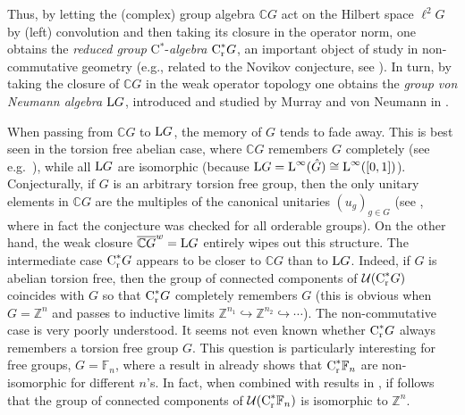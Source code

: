 \documentclass[a4paper,11pt]{amsart}
\numberwithin{equation}{section}
\begin{document}
Thus, by letting the (complex) group algebra ${\mathbb{C}} G$ act on the
Hilbert space $\ell^2 G$ by (left) convolution and then taking
its closure in the operator norm, one obtains the {\it reduced
group} C$^*$-{\it algebra} ${\text{\rm C}^*_{\text{\rm r}}} G$, an important object of
study in non-commutative geometry (e.g., related to the Novikov
conjecture, see \cite{Co94}). In turn, by taking the closure of ${\mathbb{C}}
G$ in the weak operator topology one obtains the {\it group von
Neumann algebra} ${\mathord{\text{\rm L}}} G$, introduced and studied by Murray and von
Neumann in \cite{MvN36, MvN43}.

When passing from ${\mathbb{C}} G$ to ${\mathord{\text{\rm L}}} G$, the memory of $G$ tends to fade
away. This is best seen in the torsion free abelian case, where ${\mathbb{C}}
G$ remembers $G$ completely (see e.g.\ \cite{Hi39}), while all ${\mathord{\text{\rm L}}}
G$ are isomorphic (because ${\mathord{\text{\rm L}}} G = {\mathord{\text{\rm L}}}^\infty(\hat{G}) \cong
{\mathord{\text{\rm L}}}^\infty([0,1])$). Conjecturally, if $G$ is an arbitrary torsion
free group, then the only unitary elements in ${\mathbb{C}} G$ are the
multiples of the canonical unitaries $(u_g)_{g \in G}$ (see
\cite{Hi39,Ka70}, where in fact the conjecture was checked for all
orderable groups). On the other hand, the weak closure $\overline{{\mathbb{C}}
G}^w={\mathord{\text{\rm L}}} G$ entirely wipes out this structure. The intermediate case ${\text{\rm C}^*_{\text{\rm r}}} G$ appears to
be closer to ${\mathbb{C}} G$ than to ${\mathord{\text{\rm L}}} G$. Indeed, if $G$ is abelian
torsion free, then the group of connected components of
${\mathcal{U}}({\text{\rm C}^*_{\text{\rm r}}} G)$ coincides with $G$ so that ${\text{\rm C}^*_{\text{\rm r}}} G$
completely remembers $G$ (this is obvious when $G = {\mathbb{Z}}^n$ and passes
to inductive limits ${\mathbb{Z}}^{n_1} \hookrightarrow {\mathbb{Z}}^{n_2}
\hookrightarrow \cdots$). The non-commutative case is very poorly understood. It seems not even known whether ${\text{\rm C}^*_{\text{\rm r}}} G$ always remembers a torsion free group $G$.
This question is particularly interesting for free groups, $G=\mathbb F_n$, where a
result in \cite{PV81} already shows that ${\text{\rm C}^*_{\text{\rm r}}} \mathbb F_n$ are
non-isomorphic for different $n$'s. In fact, when combined with
results in \cite{DHR97,Ri87}, if follows that the group of
connected components of ${\mathcal{U}}({\text{\rm C}^*_{\text{\rm r}}} \mathbb F_n)$ is isomorphic
to $\mathbb Z^n$.
\end{document}
